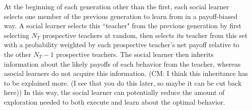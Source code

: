 \documentclass[letterpaper,11.5pt]{scrartcl}
\newcommand{\cm}[1]{{\textcolor{mypurple} {({\tiny CM:} #1)}}}
\begin{document}
At the beginning of each generation other than the first, each social learner selects
one member of the previous generation to learn from in a payoff-biased way. 
A social learner  
selects this ``teacher" from the previous generation by first selecting $N_T$ prospective teachers at random, then selects its teacher from this set with a probability weighted by each prospective teacher's net payoff 
relative to the other $N_T - 1$ prospective teachers. The social learner then inherits information about the likely payoffs of each behavior from the teacher, whereas asocial learners do not acquire this information. \cm{I think this inheritance has to be explained more. (I see that you do this later, so maybe it can be cut back here)} In this way, the social learner can potentially reduce the amount of exploration needed to both execute and learn about the optimal behavior.  



\end{document}
